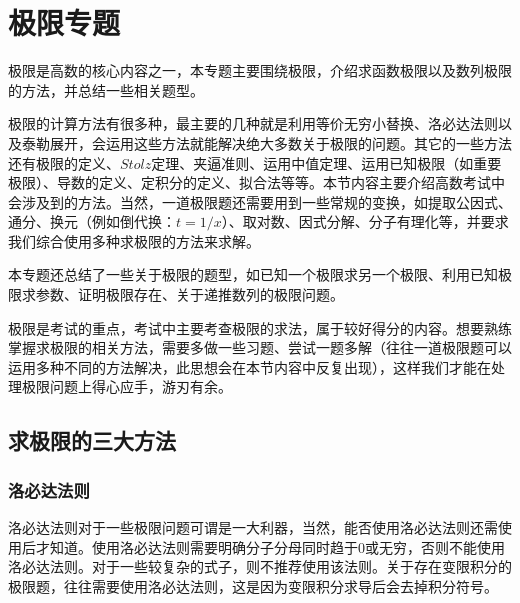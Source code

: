 \chapter{极限专题}

极限是高数的核心内容之一，本专题主要围绕极限，介绍求函数极限以及数列极限的方法，并总结一些相关题型。

极限的计算方法有很多种，最主要的几种就是利用等价无穷小替换、洛必达法则以及泰勒展开，会运用这些方法就能解决绝大多数关于极限的问题。其它的一些方法还有极限的定义、$Stolz$定理、夹逼准则、运用中值定理、运用已知极限（如重要极限）、导数的定义、定积分的定义、拟合法等等。本节内容主要介绍高数考试中会涉及到的方法。当然，一道极限题还需要用到一些常规的变换，如提取公因式、通分、换元（例如倒代换：$t = 1/x$）、取对数、因式分解、分子有理化等，并要求我们综合使用多种求极限的方法来求解。

本专题还总结了一些关于极限的题型，如已知一个极限求另一个极限、利用已知极限求参数、证明极限存在、关于递推数列的极限问题。

极限是考试的重点，考试中主要考查极限的求法，属于较好得分的内容。想要熟练掌握求极限的相关方法，需要多做一些习题、尝试一题多解（往往一道极限题可以运用多种不同的方法解决，此思想会在本节内容中反复出现），这样我们才能在处理极限问题上得心应手，游刃有余。

\section{求极限的三大方法}
\subsection{洛必达法则}
洛必达法则对于一些极限问题可谓是一大利器，当然，能否使用洛必达法则还需使用后才知道。使用洛必达法则需要明确分子分母同时趋于0或无穷，否则不能使用洛必达法则。对于一些较复杂的式子，则不推荐使用该法则。关于存在变限积分的极限题，往往需要使用洛必达法则，这是因为变限积分求导后会去掉积分符号。


